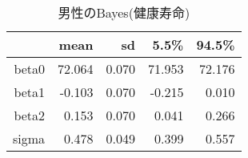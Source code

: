 \begin{table}[ht]
\centering
\begingroup\tiny
\begin{tabular}{rrrrr}
  \hline
 & mean & sd & 5.5\% & 94.5\% \\ 
  \hline
beta0 & 72.064 & 0.070 & 71.953 & 72.176 \\ 
  beta1 & -0.103 & 0.070 & -0.215 & 0.010 \\ 
  beta2 & 0.153 & 0.070 & 0.041 & 0.266 \\ 
  sigma & 0.478 & 0.049 & 0.399 & 0.557 \\ 
   \hline
\end{tabular}
\endgroup
\caption{男性のBayes(健康寿命)} 
\label{table_Gamma_HLE_FA_m}
\end{table}
